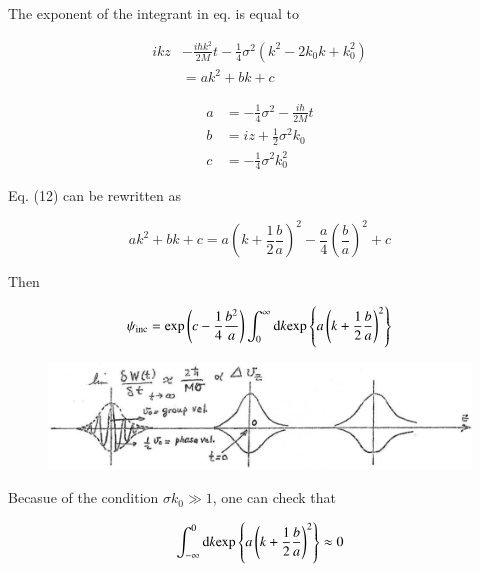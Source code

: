 \documentclass[a4paper,14pt]{book}
\begin{document}
\indent The exponent of the integrant in eq. is equal to

\begin{equation}
\begin{split}
ikz &- \frac{i\hbar k^2}{2M} t - \frac{1}{4} \sigma^2 (k^2 -2k_0k +k_0^2) \\
&= a k^2 + b k + c
\end{split}
\end{equation}

\begin{equation}
\begin{split}
a &= -\frac{1}{4} \sigma^2 - \frac{i \hbar}{2M} t \\
b &= iz + \frac{1}{2} \sigma^2 k_0 \\
c &= - \frac{1}{4} \sigma^2 k_0^2
\end{split}
\end{equation}

\noindent Eq. (12) can be rewritten as

\begin{equation}
\nonumber
a k^2 + bk + c = a \left( k + \frac{1}{2}\frac{b}{a} \right)^2 - \frac{a}{4} \left( \frac{b}{a} \right)^2 + c
\end{equation}

\noindent Then

\begin{equation}
\psi_{\rm inc} = {\rm exp} \left( c - \frac{1}{4} \frac{b^2}{a} \right) \int_0^{\infty} {\rm d}k {\rm exp} \left\{ a \left( k + \frac{1}{2} \frac{b}{a} \right)^2 \right\}
\end{equation}

\begin{figure}
\centerline{\includegraphics*[width=\textwidth]{figs_C3/2_1}}
\caption{}\label{fig2nd_1}
\end{figure}
\noindent Becasue of the condition $\sigma k_0 \gg 1$, one can check that

\begin{equation}
\int_{-\infty}^0 {\rm d}k {\rm exp} \left\{ a \left( k + \frac{1}{2} \frac{b}{a} \right)^2 \right\} \approx 0
\end{equation}
\end{document}
